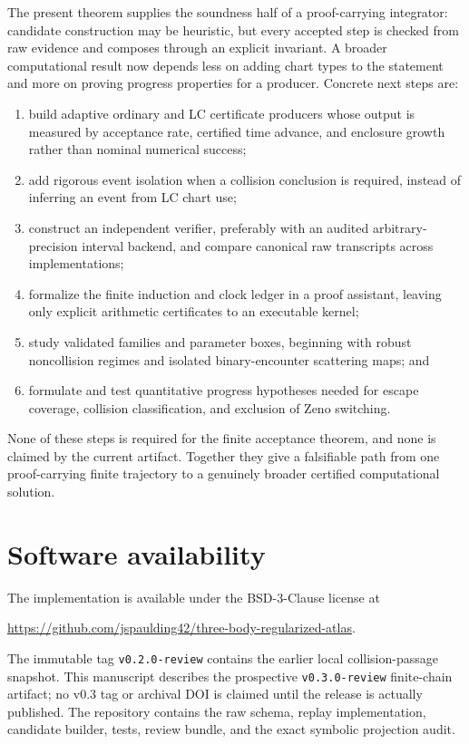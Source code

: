 \documentclass[11pt]{article}
\begin{document}
The present theorem supplies the soundness half of a proof-carrying
integrator: candidate construction may be heuristic, but every accepted step
is checked from raw evidence and composes through an explicit invariant.  A
broader computational result now depends less on adding chart types to the
statement and more on proving progress properties for a producer.  Concrete
next steps are:
\begin{enumerate}[label=(\roman*)]
\item build adaptive ordinary and LC certificate producers whose output is
      measured by acceptance rate, certified time advance, and enclosure
      growth rather than nominal numerical success;
\item add rigorous event isolation when a collision conclusion is required,
      instead of inferring an event from LC chart use;
\item construct an independent verifier, preferably with an audited
      arbitrary-precision interval backend, and compare canonical raw
      transcripts across implementations;
\item formalize the finite induction and clock ledger in a proof assistant,
      leaving only explicit arithmetic certificates to an executable kernel;
\item study validated families and parameter boxes, beginning with robust
      noncollision regimes and isolated binary-encounter scattering maps; and
\item formulate and test quantitative progress hypotheses needed for escape
      coverage, collision classification, and exclusion of Zeno switching.
\end{enumerate}
None of these steps is required for the finite acceptance theorem, and none is
claimed by the current artifact.  Together they give a falsifiable path from
one proof-carrying finite trajectory to a genuinely broader certified
computational solution.

\section{Software availability}

The implementation is available under the BSD-3-Clause license at
\begin{center}
\url{https://github.com/jspaulding42/three-body-regularized-atlas}.
\end{center}
The immutable tag \texttt{v0.2.0-review} contains the earlier local
collision-passage snapshot.  This manuscript describes the prospective
\texttt{v0.3.0-review} finite-chain artifact; no v0.3 tag or archival DOI is
claimed until the release is actually published.  The repository contains
the raw schema, replay implementation, candidate builder, tests, review
bundle, and the exact symbolic projection audit.
\end{document}
